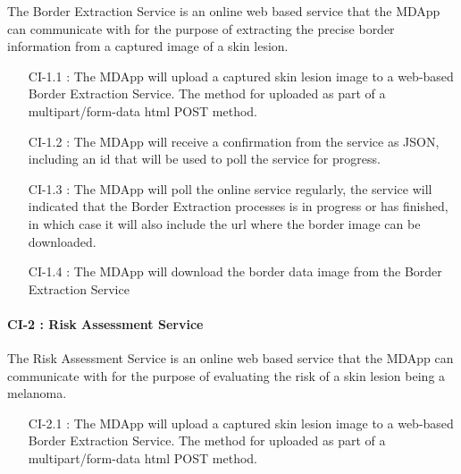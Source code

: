                 The Border Extraction Service is an online web based service that the MDApp can communicate with for the purpose of extracting the precise border information from a captured image of a skin lesion.

                \begin{itemize}[leftmargin=1.4cm]
                    \item[CI-1.1 : ] The MDApp will upload a captured skin lesion image to a web-based Border Extraction Service. The method for uploaded as part of a multipart/form-data html POST method.
                    \item[CI-1.2 : ] The MDApp will receive a confirmation from the service as JSON, including an id that will be used to poll the service for progress.
                    \item[CI-1.3 : ] The MDApp will poll the online service regularly, the service will indicated that the Border Extraction processes is in progress or has finished, in which case it will also include the url where the border image can be downloaded.
                    \item[CI-1.4 : ] The MDApp will download the border data image from the Border Extraction Service

                \end{itemize}

            \paragraph{CI-2 : Risk Assessment Service }

                The Risk Assessment Service is an online web based service that the MDApp can communicate with for the purpose of evaluating the risk of a skin lesion being a melanoma.

                \begin{itemize}[leftmargin=1.4cm]
                    \item[CI-2.1 : ] The MDApp will upload a captured skin lesion image to a web-based Border Extraction Service. The method for uploaded as part of a multipart/form-data html POST method.

                \end{itemize}